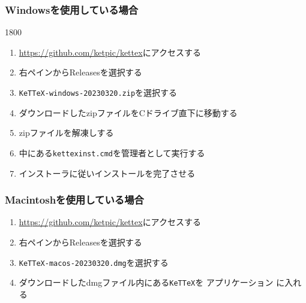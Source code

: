 \subsubsection{Windowsを使用している場合}
\begin{layer}{180}{0}
\end{layer}
\begin{enumerate}
    \item \url{https://github.com/ketpic/kettex}にアクセスする
    \item 右ペインからReleasesを選択する
    \item \verb|KeTTeX-windows-20230320.zip|を選択する
    \item ダウンロードしたzipファイルをCドライブ直下に移動する
    \item zipファイルを解凍しする
    \item 中にある\verb|kettexinst.cmd|を管理者として実行する
    \item インストーラに従いインストールを完了させる
\end{enumerate}

\subsubsection{Macintoshを使用している場合}
\begin{enumerate}
    \item \url{https://github.com/ketpic/kettex}にアクセスする
    \item 右ペインからReleasesを選択する
    \item \verb|KeTTeX-macos-20230320.dmg|を選択する
    \item ダウンロードしたdmgファイル内にある\verb|KeTTeX|を アプリケーション に入れる
\end{enumerate}

\newpage

